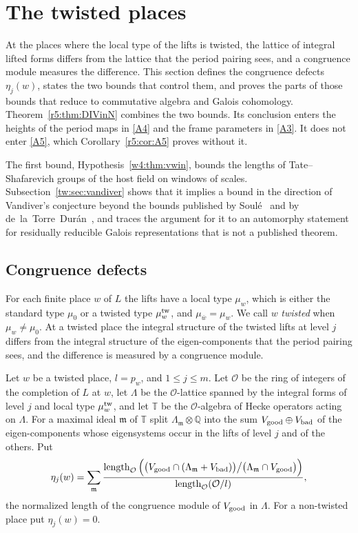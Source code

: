 \section{The twisted places}\label{sec:twisted}

At the places where the local type of the lifts is twisted, the lattice of integral lifted forms differs from the lattice that the period pairing sees, and a congruence module measures the difference. This section defines the congruence defects $\eta_j(w)$, states the two bounds that control them, and proves the parts of those bounds that reduce to commutative algebra and Galois cohomology. Theorem~\ref{r5:thm:DIVinN} combines the two bounds. Its conclusion enters the heights of the period maps in \eqref{A4} and the frame parameters in \eqref{A3}. It does not enter \eqref{A5}, which Corollary~\ref{r5:cor:A5} proves without it.

The first bound, Hypothesis~\ref{w4:thm:vwin}, bounds the lengths of Tate--Shafarevich groups of the host field on windows of scales. Subsection~\ref{tw:sec:vandiver} shows that it implies a bound in the direction of Vandiver's conjecture beyond the bounds published by Soul\'e~\cite{soule99} and by de~la~Torre~Dur\'an~\cite{delatorre}, and traces the argument for it to an automorphy statement for residually reducible Galois representations that is not a published theorem.

\subsection{Congruence defects}\label{tw:sec:eta}

For each finite place $w$ of $L$ the lifts have a local type $\mu_w$, which is either the standard type $\mu_0$ or a twisted type $\mu^{\rm tw}_w$, and $\mu_{\bar w}=\mu_w$. We call $w$ \emph{twisted} when $\mu_w\ne\mu_0$. At a twisted place the integral structure of the twisted lifts at level $j$ differs from the integral structure of the eigen-components that the period pairing sees, and the difference is measured by a congruence module.

\begin{definition}\label{r5:def:eta}
Let $w$ be a twisted place, $l=p_w$, and $1\le j\le m$. Let $\mathcal O$ be the ring of integers of the completion of $L$ at $w$, let $\Lambda$ be the $\mathcal O$-lattice spanned by the integral forms of level $j$ and local type $\mu^{\rm tw}_w$, and let $\mathbb T$ be the $\mathcal O$-algebra of Hecke operators acting on $\Lambda$. For a maximal ideal $\mathfrak m$ of $\mathbb T$ split $\Lambda_{\mathfrak m}\otimes\mathbb Q$ into the sum $V_{\rm good}\oplus V_{\rm bad}$ of the eigen-components whose eigensystems occur in the lifts of level $j$ and of the others. Put
\[
\eta_j(w)=\sum_{\mathfrak m}\frac{\operatorname{length}_{\mathcal O}\Big(\big(V_{\rm good}\cap(\Lambda_{\mathfrak m}+V_{\rm bad})\big)\big/\big(\Lambda_{\mathfrak m}\cap V_{\rm good}\big)\Big)}{\operatorname{length}_{\mathcal O}(\mathcal O/l)} ,
\]
the normalized length of the congruence module of $V_{\rm good}$ in $\Lambda$. For a non-twisted place put $\eta_j(w)=0$.
\end{definition}

